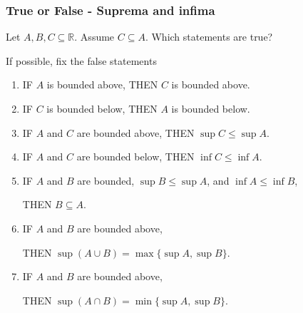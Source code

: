 \begin{frame}[t]
	\fontsize{12}{12}\selectfont
	\frametitle{True or False - Suprema and infima}

	Let $A, B, C \subseteq \mathbb{R}$. Assume $C \subseteq A$. Which statements are
	true?
	\vspace{.1cm}

	If possible, fix the false statements
	\vspace{.2cm}
	\begin{enumerate}
		\item IF \;$A$ is bounded above, \; THEN \;$C$ is bounded above.

		\item IF \;$C$ is bounded below, \; THEN \;$A$ is bounded below.
			\vspace{.2cm}

		\item IF \;$A$ and $C$ are bounded above, \; THEN \;$\sup C \leq \sup A$.

		\item IF \;$A$ and $C$ are bounded below, \; THEN \;$\inf C \leq \inf A$.
			\vspace{.2cm}

		\item IF \;$A$ and $B$ are bounded, \;$\sup B \leq \sup A$, \;and \;$\inf A \leq
			\inf B$,
			\vspace{.1cm}

			THEN \;$B \subseteq A$.
			\vspace{.2cm}

		\item IF \;$A$ and $B$ are bounded above,
			\vspace{.1cm}

			THEN \;$\displaystyle \sup (A \cup B) =\max \{ \sup A, \sup B \}$.
			\vspace{.2cm}

		\item IF \;$A$ and $B$ are bounded above,
			\vspace{.1cm}

			THEN \;$\displaystyle \sup (A \cap B) =\min \{ \sup A, \sup B \}$.
	\end{enumerate}
\end{frame}


